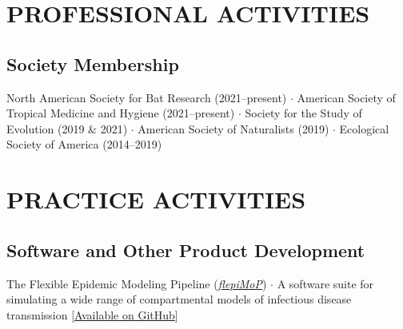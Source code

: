 \documentclass{cv}
\begin{document}

\section*{PROFESSIONAL ACTIVITIES}

\subsection*{Society Membership}

North American Society for Bat Research (2021--present) $\cdot$ American Society of Tropical Medicine and Hygiene (2021--present) $\cdot$ Society for the Study of Evolution (2019 \& 2021) $\cdot$ American Society of Naturalists (2019) $\cdot$ Ecological Society of America (2014--2019)






\section*{PRACTICE ACTIVITIES}

\subsection*{Software and Other Product Development}

The Flexible Epidemic Modeling Pipeline (\href{https://www.flepimop.org/}{\textit{flepiMoP}}) $\cdot$ A software suite for simulating a wide range of compartmental models of infectious disease transmission [\href{https://github.com/HopkinsIDD/flepiMoP}{Available on GitHub}]
\end{document}
